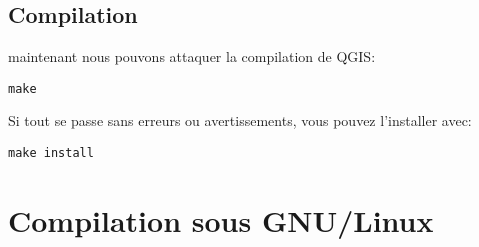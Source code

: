 % 
% 
% 
% 
% 
% 
% 

\subsection{Compilation}
maintenant nous pouvons attaquer la compilation de QGIS:

\begin{verbatim}
make 
\end{verbatim}

Si tout se passe sans erreurs ou avertissements, vous pouvez l'installer avec:

\begin{verbatim}
make install 
\end{verbatim}

\section{Compilation sous GNU/Linux}\label{sec:install_linux}
